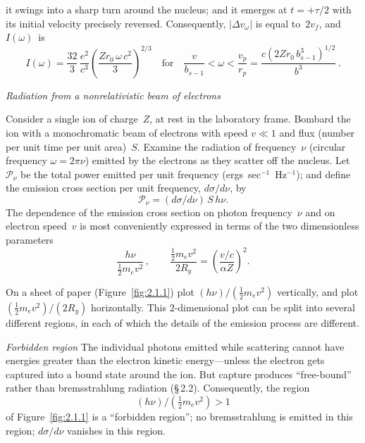 \noindent it swings into a sharp turn around the nucleus; and it emerges
at $t = +\tau/2$ with its initial velocity precisely reversed.
Consequently, $|\Delta v_\omega|$ is equal to~$2v_f$, and $I(\omega)$~is
\begin{equation}
  I(\omega)
  = \frac{32}{3}\,\frac{e^{2}}{c^{3}}
    \left(\frac{Zr_0\,\omega\,c^{2}}{3}\right)^{\!2/3}
  \quad\text{for}\quad
  \frac{v}{b_{s-1}} < \omega < \frac{v_p}{r_p}
  = \frac{c(2Zr_0\,b_{s-1}^{3})^{1/2}}{b^{3}}\,.
  \tag{2.1.6b}
\end{equation}


\bigskip
\noindent\textit{Radiation from a nonrelativistic beam of electrons}

\medskip

Consider a single ion of charge~$Z$, at rest in the laboratory frame.
Bombard the ion with a monochromatic beam of electrons with speed
$v \ll 1$ and flux (number per unit time per unit area)~$S$.  Examine the
radiation of frequency~$\nu$ (circular frequency $\omega = 2\pi\nu$)
emitted by the electrons as they scatter off the nucleus.
Let $\mathscr{P}_\nu$ be the total power emitted per unit frequency
(ergs~sec$^{-1}$~Hz$^{-1}$); and define the emission cross section per
unit frequency, $d\sigma/d\nu$, by
\begin{equation}
  \mathscr{P}_\nu = (d\sigma/d\nu)\,S\,h\nu.
  \tag{2.1.7}
\end{equation}
The dependence of the emission cross section on photon frequency~$\nu$
and on electron speed~$v$ is most conveniently expressed in terms of
the two dimensionless parameters
\begin{equation}
  \frac{h\nu}{\tfrac{1}{2}m_e v^{2}}\,,
  \qquad
  \frac{\tfrac{1}{2}m_e v^{2}}{2R_y}
  = \left(\frac{v/c}{\alpha Z}\right)^{\!2}.
  \tag{2.1.8}
\end{equation}

On a sheet of paper (Figure~\ref{fig:2.1.1}) plot
$(h\nu)/(\tfrac{1}{2}m_e v^{2})$ vertically, and plot
$(\tfrac{1}{2}m_e v^{2})/(2R_y)$ horizontally.  This 2-dimensional plot
can be split into several different regions, in each of which the details
of the emission process are different.

\bigskip
\noindent\textit{Forbidden region}\quad
The individual photons emitted while scattering cannot have energies
greater than the electron kinetic energy---unless the electron gets
captured into a bound state around the ion.  But capture produces
``free-bound'' rather than bremsstrahlung radiation (\S\,2.2).
Consequently, the region
\begin{equation}
  (h\nu)/(\tfrac{1}{2}m_e v^{2}) > 1
  \tag{2.1.9a}
\end{equation}
of Figure~\ref{fig:2.1.1} is a ``forbidden region''; no bremsstrahlung
is emitted in this region; $d\sigma/d\nu$ vanishes in this region.

